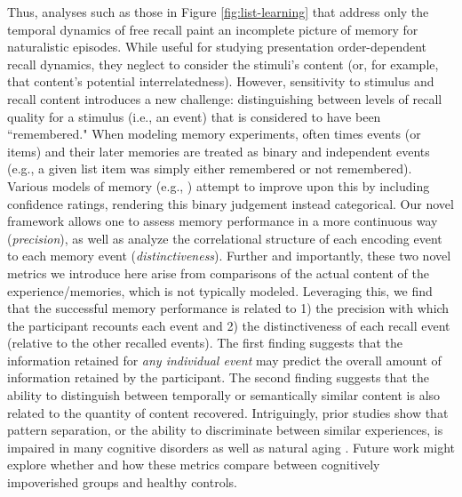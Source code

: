 \documentclass{article}
\begin{document}
Thus, analyses such as those in Figure \ref{fig:list-learning} that address only the temporal dynamics of free recall paint an incomplete picture of memory for naturalistic episodes.  While useful for studying presentation order-dependent recall dynamics, they neglect to consider the stimuli's content (or, for example, that content's potential interrelatedness).  However, sensitivity to stimulus and recall content introduces a new challenge: distinguishing between levels of recall quality for a stimulus (i.e., an event) that is considered to have been ``remembered."  When modeling memory experiments, often times events (or items) and their later memories are treated as binary and independent events (e.g., a given list item was simply either remembered or not remembered).  Various models of memory (e.g., \citealp{Yone02}) attempt to improve upon this by including confidence ratings, rendering this binary judgement instead categorical.  Our novel framework allows one to assess memory performance in a more continuous way (\textit{precision}), as well as analyze the correlational structure of each encoding event to each memory event (\textit{distinctiveness}). Further and importantly, these two novel metrics we introduce here arise from comparisons of the actual content of the experience/memories, which is not typically modeled.  Leveraging this, we find that the successful memory performance is related to 1) the precision with which the participant recounts each event and 2) the distinctiveness of each recall event (relative to the other recalled events). The first finding suggests that the information retained for \textit{any individual event} may predict the overall amount of information retained by the participant.  The second finding suggests that the ability to distinguish between temporally or semantically similar content is also related to the quantity of content recovered. Intriguingly, prior studies show that pattern separation, or the ability to discriminate between similar experiences, is impaired in many cognitive disorders as well as natural aging \citep{StarEtal10, YassEtal11c, YassStar11b}.  Future work might explore whether and how these metrics compare between cognitively impoverished groups and healthy controls.
\end{document}

